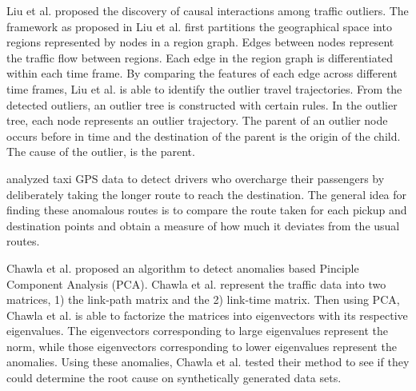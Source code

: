 \documentclass[10pt]{article}
\begin{document}
Liu et al. \cite{Liu2011} proposed the discovery of causal interactions among traffic outliers. The framework as proposed in Liu et al.\cite{Liu2011} first partitions the geographical space into regions represented by nodes in a region graph. Edges between nodes represent the traffic flow between regions. Each edge in the region graph is differentiated within each time frame. By comparing the features of each edge across different time frames, Liu et al. is able to identify the outlier travel trajectories. From the detected outliers, an outlier tree is constructed with certain rules. In the outlier tree, each node represents an outlier trajectory. The parent of an outlier node occurs before in time and the destination of the parent is the origin of the child. The cause of the outlier, is the parent.


\cite{Ge2011,Zhang2011,Zhang2012} analyzed taxi GPS data to detect drivers who overcharge their passengers by deliberately taking the longer route to reach the destination. The general idea for finding these anomalous routes is to compare the route taken for each pickup and destination points and obtain a measure of how much it deviates from the usual routes.

Chawla et al. \cite{Chawla2012} proposed an algorithm to detect anomalies based Pinciple Component Analysis (PCA). Chawla et al. \cite{Chawla2012} represent the traffic data into two matrices, 1) the link-path matrix and the 2) link-time matrix. Then using PCA, Chawla et al. \cite{Chawla2012} is able to factorize the matrices into eigenvectors with its respective eigenvalues. The eigenvectors corresponding to large eigenvalues represent the norm, while those eigenvectors corresponding to lower eigenvalues represent the anomalies. Using these anomalies, Chawla et al. \cite{Chawla2012} tested their method to see if they could determine the root cause on synthetically generated data sets.
\end{document}
